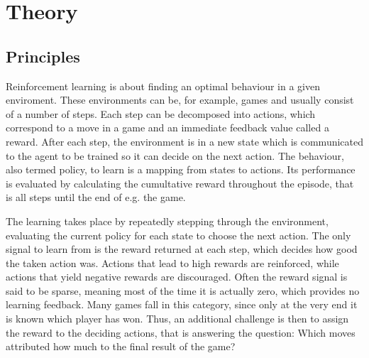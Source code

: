 \chapter{Theory}

\section{Principles}


Reinforcement learning is about finding an optimal behaviour in a given enviroment.
These environments can be, for example, games and usually consist of a number of steps.
Each step can be decomposed into actions, which correspond to a move in a game and an
immediate feedback value called a reward.
After each step, the environment is in a new state which is communicated to the agent to
be trained so it can decide on the next action.
The behaviour, also termed policy, to learn is a mapping from states to actions.
Its performance is evaluated by calculating the cumultative reward throughout the episode,
that is all steps until the end of e.g. the game.

The learning takes place by repeatedly stepping through the environment, evaluating the
current policy for each state to choose the next action.
The only signal to learn from is the reward returned at each step, which decides how good
the taken action was.
Actions that lead to high rewards are reinforced, while actions that yield negative
rewards are discouraged.
Often the reward signal is said to be sparse, meaning most of the time it is actually
zero, which provides no learning feedback.
Many games fall in this category, since only at the very end it is known which player has
won.
Thus, an additional challenge is then to assign the reward to the deciding actions, that
is answering the question:
Which moves attributed how much to the final result of the game?

